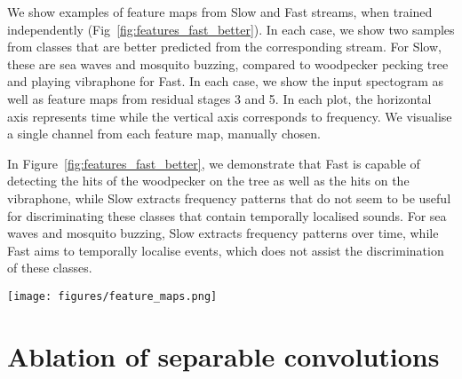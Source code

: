 \documentclass{article}
\begin{document}
We show examples of feature maps from Slow and Fast streams, when trained independently (Fig~\ref{fig:features_fast_better}). In each case, we show two samples from classes that are better predicted from the corresponding stream.
For Slow, these are sea waves and mosquito buzzing, compared to woodpecker pecking tree and playing vibraphone for Fast.
In each case, we show the input spectogram as well as feature maps from residual stages 3 and 5.
In each plot, the horizontal axis represents time while the vertical axis corresponds to frequency.
We visualise a single channel from each feature map, manually chosen. 

In Figure~\ref{fig:features_fast_better}, we demonstrate that Fast is capable of detecting the hits of the woodpecker on the tree as well as the hits on the vibraphone, while Slow extracts frequency patterns that do not seem to be useful for discriminating these classes that contain temporally localised sounds. For sea waves and mosquito buzzing, Slow extracts frequency patterns over time, while Fast aims to temporally localise events, which does not assist the discrimination of these classes.

\begin{figure*}[t!]
    \centering
        \texttt{[image: figures/feature\_maps.png]}
    \caption{Feature maps from classes that are better predicted from Slow (left) and Fast (right) streams.}

\label{fig:features_fast_better}
\end{figure*}


\section{Ablation of separable convolutions}

\begin{table}[t!]
\centering
{}
\caption{Ablation of separable convolutions on VGG-Sound.}
\label{tab:separable}
\end{table}
\end{document}
